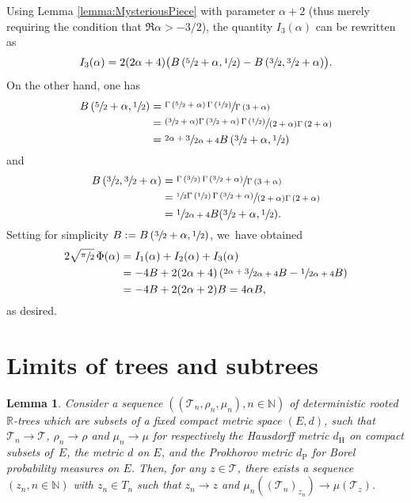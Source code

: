 \documentclass[JEP,XML,SOM,Unicode,NoFloatCountersInSection, NoEqCountersInSection,published]{cedram}
\newcommand{\R}{{\mathbb{R}}}
\newcommand{\N}{\mathbb{N}}
\newcommand{\T}{\mathcal{T}}\let\CRT\T\let\tbr\T
\newtheorem{lem}[thm]{Lemma}
\theoremstyle{definition}
\begin{document}
Using Lemma \ref{lemma:MysteriousPiece} with parameter $\alpha+2$ (thus merely requiring the condition that $\Re \alpha > -3/2$), the quantity $I_3(\alpha)$ can be rewritten as
\[
I_3(\alpha) = 2(2\alpha+4) \bigl(B\left(\sfrac{5}{2}+\alpha, \sfrac{1}{2} \right) -B\left(\sfrac{3}{2}, \sfrac{3}{2}+\alpha\right) \bigr).
\]
On the other hand, one has
\begin{align*}
B\left(\sfrac{5}{2}+\alpha, \sfrac{1}{2} \right) &= \sfrac{\Gamma\left(\sfrac{5}{2}+\alpha\right) \Gamma\left(\sfrac{1}{2} \right)}{\Gamma\left(3+\alpha\right)} \\
&= \sfrac{(\sfrac{3}{2}+\alpha) \Gamma\left(\sfrac{3}{2}+\alpha\right) \Gamma\left(\sfrac{1}{2} \right)}{(2+\alpha) \Gamma\left(2+\alpha\right)}\\
&= \sfrac{2\alpha+3}{2\alpha+4} B\left(\sfrac{3}{2}+\alpha, \sfrac{1}{2} \right)
\end{align*}
and
\begin{align*}
B\left(\sfrac{3}{2}, \sfrac{3}{2}+\alpha \right) &= \sfrac{\Gamma\left(\sfrac{3}{2} \right) \Gamma\left(\sfrac{3}{2}+\alpha \right)}{\Gamma\left(3+\alpha \right)} \\
&= \sfrac{\sfrac{1}{2}\Gamma\left(\sfrac{1}{2} \right) \Gamma\left(\sfrac{3}{2}+\alpha \right)}{(2+\alpha)\Gamma\left(2+\alpha \right)}\\
&= \sfrac{1}{2\alpha+4} B(\sfrac{3}{2}+\alpha, \sfrac{1}{2}).
\end{align*}
Setting for simplicity $B:=B\left(\sfrac{3}{2}+\alpha, \sfrac{1}{2} \right)$, we~have obtained
\begin{align*}
2\sqrt{\sfrac{\pi}{2}}\,\Phi(\alpha) &= I_1(\alpha) + I_2(\alpha) + I_3(\alpha)\\
&= -4B + 2(2\alpha+4)\left(\sfrac{2\alpha+3}{2\alpha+4}B-\sfrac{1}{2\alpha+4} B \right)\\
&=-4B + 2(2\alpha+2)B =4\alpha B,
\end{align*}
as desired.

\section{Limits of trees and subtrees}

\begin{lem}\label{lemma:annoyingmetricthing}
Consider a sequence $((\T_n,\rho_n,\mu_n),n\in\N)$ of deterministic rooted $\R$\nobreakdash-trees which are subsets of a fixed compact metric space $(E,d)$, such that $\T_n\to \T$, $\rho_n\to \rho$ and $\mu_n\to\mu$ for respectively the Hausdorff metric $d_{\mathrm{H}}$ on compact subsets of~$E$, the metric $d$ on $E$, and the Prokhorov metric $d_{\mathrm{P}}$ for Borel probability measures on $E$.
Then, for any $z\in\T$, there exists a sequence $(z_n,n\in\N)$ with $z_n\in T_n$ such that $z_n\to z$ and $\mu_n((\T_n)_{z_n}) \to \mu(\T_z)$.
\end{lem}
\end{document}
